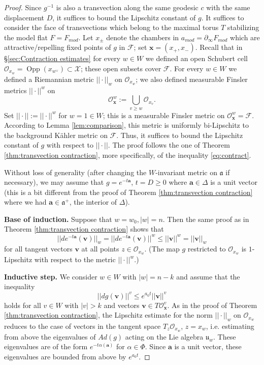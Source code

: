 \documentclass[12pt]{amsbook}%
\theoremstyle{definition}
\theoremstyle{remark}
\numberwithin{section}{chapter}
\numberwithin{subsection}{section}
\numberwithin{figure}{chapter}
\DeclareMathOperator{\Opp}{Opp}
\def\Fmod{F_{mod}}
\def\amod{a_{mod}}
\def\cF{{\mathscr{F}}}
\def\cO{{\mathscr{O}}}
\def\cX{{\mathscr{X}}}
\def\ba{\mathbf{a}}
\def\bv{\mathbf{v}}
\def\bx{\mathbf{x}}
\def\al{\alpha}
\def\geo{\partial_\infty}
\begin{document}
{{\begin{proof}
Since $g^{-1}$ is also a transvection along the same geodesic $c$ with the same displacement $D$, it suffices to bound the Lipschitz constant of $g$. It suffices to consider the face of transvections which belong to the maximal torus $T$ stabilizing the model flat $F=\Fmod$. Let $x_\pm$ denote the chambers in $\amod=\geo \Fmod$ which are attractive/repelling fixed points of $g$ in $\cF$; set $\bx=(x_+,x_-)$. 
Recall that in \S \ref{sec:Contraction estimates} for every $w\in W$ we defined an open Schubert cell $\cO_{x_w}=\Opp(x_{w^\vee})\subset \cX$; these open subsets cover $\cF$. For every $w\in W$ we defined a Riemannian metric $||\cdot||_w$ on   $\cO_{x_w}$; we also defined measurable Finsler metrics $||\cdot||^w$ 
on
$$
\cO_{\bx}^{w}:= \bigcup_{v\ge w} \cO_{x_v}.
$$
Set $||\cdot||:= ||\cdot||^w$ for $w=1\in W$; this is a measurable Finsler metric on $\cO_{\bx}^{w}=\cF$. According to Lemma \ref{lem:comparison}, this metric is uniformly bi-Lipschitz to the background K\"ahler metric on $\cF$. Thus, it suffices to bound the Lipschitz constant of $g$ with respect to $||\cdot||$. 
The proof follows the one of Theorem \ref{thm:transvection contraction}, more specifically, of the inequality \eqref{eq:contract}. 

Without loss of generality (after changing the $W$-invariant metric on $\mathfrak{a}$ if necessary), 
we may assume that $g=e^{-t\ba}$, $t=D\geqslant 0$ where $\ba\in \Delta$ is a unit vector (this is a bit different from the proof of 
Theorem \ref{thm:transvection contraction} where we had $\ba\in \mathfrak{a}^+$, the interior of $\Delta$). 

\medskip 
{\bf Base of induction.} Suppose that $w=w_0, |w|=n$. Then the same proof as in Theorem \ref{thm:transvection contraction} shows that 
$$
||de^{-t\ba}(\bv)||_w= ||de^{-t\ba}(\bv)||^w \leqslant  ||\bv||^w =  ||\bv||_w
 $$
 for all tangent vectors $\bv$ at all points $z\in \cO_{x_w}$. (The map $g$ restricted to $\cO_{x_w}$ is $1$-Lipschitz with respect to the metric 
 $||\cdot||^w$.) 
 

\medskip 
{\bf Inductive step.} We consider $w\in W$ with $|w|=n-k$ and assume that %
the inequality 
\begin{equation}\label{eq:contract1} 
 ||dg (\bv)||^v\leqslant  e^{a_{0} t} ||\bv||^v 
\end{equation}
holds for all $v\in W$ with $|v|> k$ and vectors $\bv\in T\cO_{\bx}^v$.  As in the proof of Theorem \ref{thm:transvection contraction}, the Lipschitz estimate for 
the norm $||\cdot||_w$ on $ \cO_{x_w}$ reduces to the case of vectors in the tangent space  $T_z\cO_{x_w}$, $z=x_w$, i.e. estimating from above 
the eigenvalues   of $Ad(g)$ acting on the Lie algebra $\mathfrak{u}_w$. These eigenvalues are of the form $e^{-t\al(\ba)}$ for 
$\al\in \Phi$. Since $\ba$ is a unit vector, these eigenvalues are bounded from above by  
$ e^{a_{0} t}$. %


\end{proof}}}
\end{document}
